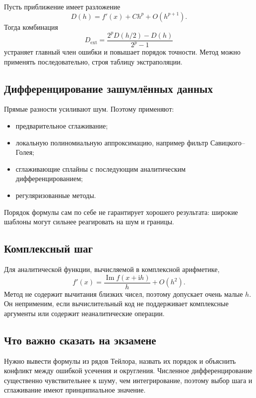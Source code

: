 Пусть приближение имеет разложение
\[
    D(h)=f'(x)+Ch^p+O(h^{p+1}).
\]
Тогда комбинация
\[
    D_{\mathrm{ext}}=
    \frac{2^pD(h/2)-D(h)}{2^p-1}
\]
устраняет главный член ошибки и повышает порядок точности. Метод можно применять
последовательно, строя таблицу экстраполяции.

\subsection{Дифференцирование зашумлённых данных}

Прямые разности усиливают шум. Поэтому применяют:
\begin{itemize}
    \item предварительное сглаживание;
    \item локальную полиномиальную аппроксимацию, например фильтр
          Савицкого--Голея;
    \item сглаживающие сплайны с последующим аналитическим дифференцированием;
    \item регуляризованные методы.
\end{itemize}
Порядок формулы сам по себе не гарантирует хорошего результата: широкие шаблоны
могут сильнее реагировать на шум и границы.

\subsection{Комплексный шаг}

Для аналитической функции, вычисляемой в комплексной арифметике,
\[
    f'(x)=\frac{\operatorname{Im}f(x+\mathrm{i}h)}{h}+O(h^2).
\]
Метод не содержит вычитания близких чисел, поэтому допускает очень малые $h$.
Он неприменим, если вычислительный код не поддерживает комплексные аргументы или
содержит неаналитические операции.

\subsection{Что важно сказать на экзамене}

Нужно вывести формулы из рядов Тейлора, назвать их порядок и объяснить конфликт
между ошибкой усечения и округления. Численное дифференцирование существенно
чувствительнее к шуму, чем интегрирование, поэтому выбор шага и сглаживание имеют
принципиальное значение.

\newpage
